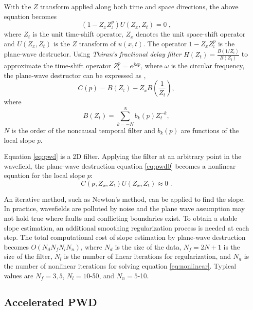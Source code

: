 With the $Z$ transform applied along both time and space directions, 
the above equation becomes
\begin{equation}\label{eq:pwd0}
(1-Z_xZ_t^p)U(Z_x,Z_t)=0\;,
\end{equation}
where $Z_t$ is the unit time-shift operator,
$Z_x$ denotes the unit space-shift operator
and $U(Z_x,Z_t)$ is the $Z$ transform of $u(x,t)$.
The operator $1-Z_xZ_t^p$ is the plane-wave destructor.
Using \textit{Thiran's fractional delay filter} 
$H(Z_t)=\displaystyle{\frac{B(1/Z_t)}{B(Z_t)}}$
\cite[]{thiran1971recursive}
to approximate the time-shift operator $Z_t^p=e^{j\omega p}$,
where $\omega$ is the circular frequency,
the plane-wave destructor can be expressed as 
\cite[]{fomel:1946},
\begin{equation}\label{eq:pwd}
C(p)=B(Z_t)-Z_xB(\frac{1}{Z_t}),
\end{equation}
where
\begin{equation}
B(Z_t)=\sum_{k=-N}^N b_k(p) Z_t^{-k},
\end{equation}
$N$ is the order of the noncausal temporal filter
and $b_k(p)$ are functions of the local slope $p$.

Equation \ref{eq:pwd} is a 2D filter.
Applying the filter at an arbitrary point in the wavefield,
the plane-wave destruction equation \ref{eq:pwd0} becomes 
a nonlinear equation for the local slope $p$:
\begin{equation}\label{eq:nonlinear}
C(p, Z_x, Z_t)U(Z_x,Z_t) \approx 0\;.
\end{equation}

An iterative method, such as Newton's method,
can be applied to find the slope.
In practice, wavefields are polluted by noise
and the plane wave assumption may not hold true 
where faults and conflicting boundaries exist.
To obtain a stable slope estimation,
an additional smoothing regularization process \cite[]{fomel:R29} 
is needed at each step.
The total computational cost of slope estimation by 
plane-wave destruction becomes $O(N_dN_fN_lN_n)$,
where $N_d$ is the size of the data, 
$N_f=2N+1$ is the size of the filter,
$N_l$ is the number of linear iterations for regularization,
and $N_n$ is the number of nonlinear iterations 
for solving equation \ref{eq:nonlinear}.
Typical values are $N_f=3,5$, $N_l=10$-50, and $N_n=5$-10.



\subsection{Accelerated PWD}

